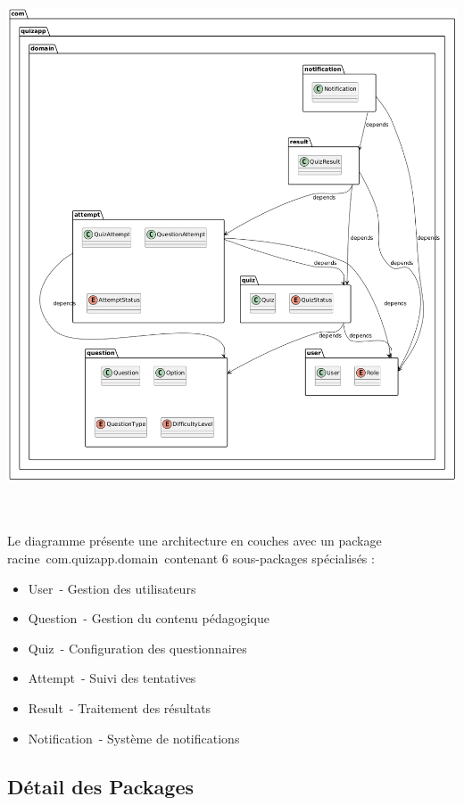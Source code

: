 \documentclass[12pt,a4paper,twoside]{report}
\begin{document}
\includegraphics[width=6.3in,height=6.64399in]{latex_media/media/image17.png}Le
diagramme présente une architecture en couches avec un package
racine~com.quizapp.domain~contenant 6 sous-packages spécialisés :

\begin{itemize}
\item
  User~- Gestion des utilisateurs
\item
  Question~- Gestion du contenu pédagogique
\item
  Quiz~- Configuration des questionnaires
\item
  Attempt~- Suivi des tentatives
\item
  Result~- Traitement des résultats
\item
  Notification~- Système de notifications
\end{itemize}

\hypertarget{duxe9tail-des-packages}{%
\subsection{Détail des Packages}\label{duxe9tail-des-packages}}
\end{document}
